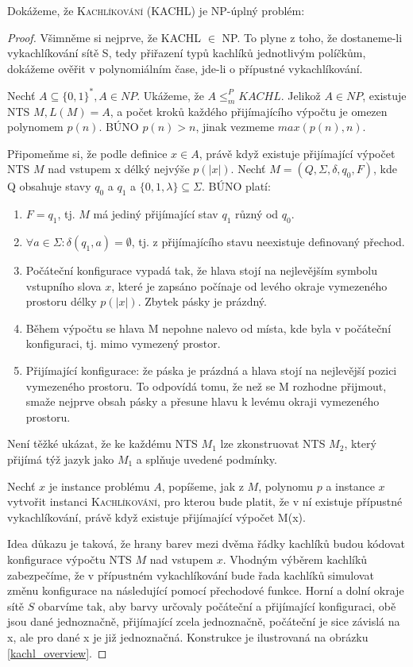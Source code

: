 \documentclass[11pt]{report} %
\numberwithin{equation}{section}
\begin{document}
Dokážeme, že \textsc{Kachlíkování (KACHL)} je NP-úplný problém:
\begin{proof}
Všimněme si nejprve, že KACHL $\in$ NP. To plyne z toho, že dostaneme-li vykachlíkování sítě S, tedy přiřazení typů kachlíků jednotlivým políčkům, dokážeme ověřit v polynomiálním čase, jde-li o přípustné vykachlíkování. 
 
Nechť $A \subseteq \{0,1\}^*, A \in NP $. Ukážeme, že $A \leq_m^P KACHL$. Jelikož $A \in NP$, existuje NTS $M, L(M) = A$, a počet kroků každého přijímajícího výpočtu je omezen polynomem $p(n)$. BÚNO $p(n) > n$, jinak vezmeme $max(p(n), n)$.

Připomeňme si, že podle definice $x \in A$, právě když existuje přijímající výpočet NTS $M$ nad vstupem x délký nejvýše $p(|x|)$. Nechť $M = (Q, \Sigma, \delta, q_0, F)$, kde Q obsahuje stavy $q_0$ a $q_1$ a $\{0, 1, \lambda\} \subseteq \Sigma$. BÚNO platí:
\begin{enumerate}
	
	
	\item  $F = {q_1}$, tj. $M$ má jediný přijímající stav $q_1$ různý od $q_0$.
	\item $\forall a \in \Sigma : \delta(q_1, a) = \emptyset$, tj. z přijímajícího stavu neexistuje definovaný přechod.
	\item Počáteční konfigurace vypadá tak, že hlava stojí na nejlevějším symbolu vstupního slova $x$, které je zapsáno počínaje od levého okraje vymezeného prostoru délky $p(|x|)$. Zbytek pásky je prázdný.
	\item Během výpočtu se hlava M nepohne nalevo od místa, kde byla v počáteční konfiguraci, tj. mimo vymezený prostor.
	\item Přijímající konfigurace: že páska je prázdná a hlava stojí na nejlevější pozici vymezeného prostoru. To odpovídá tomu, že než se M rozhodne přijmout, smaže nejprve obsah pásky a přesune hlavu k levému okraji vymezeného prostoru.
\end{enumerate}
Není těžké ukázat, že ke každému NTS $M_1$ lze zkonstruovat NTS $M_2$, který přijímá týž jazyk jako $M_1$ a splňuje uvedené podmínky.

Nechť $x$ je instance problému $A$, popíšeme, jak z $M$, polynomu $p$ a instance $x$ vytvořit instanci \textsc{Kachlíkování}, pro kterou bude platit, že v ní existuje přípustné vykachlíkování, právě když existuje přijímající výpočet M(x).

Idea důkazu je taková, že hrany barev mezi dvěma řádky kachlíků budou kódovat konfigurace výpočtu NTS $M$ nad vstupem $x$. Vhodným výběrem kachlíků zabezpečíme, že v přípustném vykachlíkování bude řada kachlíků simulovat změnu konfigurace na následující pomocí přechodové funkce. Horní a dolní okraje sítě $S$ obarvíme tak, aby barvy určovaly počáteční a
přijímající konfiguraci, obě jsou dané jednoznačně, přijímající zcela jednoznačně, počáteční je sice závislá na x, ale pro dané x je již jednoznačná. Konstrukce je ilustrovaná na obrázku \ref{kachl_overview}.


\end{proof}
\end{document}

